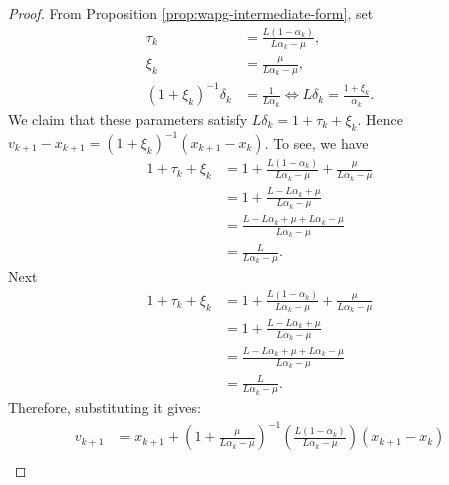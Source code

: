 \documentclass[12pt]{article}
\begin{document}
        \begin{proof}
            From Proposition \ref{prop:wapg-intermediate-form}, set 
            \begin{align*}
                \tau_k &= \frac{L(1 - \alpha_k)}{L\alpha_k - \mu}, 
                \\
                \xi_k &= \frac{\mu}{L \alpha_k - \mu},
                \\
                (1 + \xi_k)^{-1}\delta_k &= \frac{1}{L\alpha_k}
                \iff L \delta_k = \frac{1 + \xi_k}{\alpha_k}. 
            \end{align*}
            We claim that these parameters satisfy $L\delta_k = 1 + \tau_k + \xi_k$. 
            Hence $v_{k + 1} - x_{k + 1} = (1 + \xi_k)^{-1}(x_{k + 1} - x_k)$. 
            To see, we have 
            \begin{align*}
                1 + \tau_k + \xi_k &= 
                1 + \frac{L(1 - \alpha_k)}{L \alpha_k - \mu} 
                + \frac{\mu}{L \alpha_k - \mu}
                \\
                &= 
                1 + \frac{L - L \alpha_k + \mu}{L\alpha_k - \mu}
                \\
                &= 
                \frac{L - L \alpha_k + \mu + L \alpha_k - \mu}{L\alpha_k - \mu}
                \\
                &= \frac{L}{L\alpha_k - \mu}. 
            \end{align*}
            Next
            \begin{align*}
                1 + \tau_k + \xi_k &= 
                1 + \frac{L(1 - \alpha_k)}{L \alpha_k - \mu} 
                + \frac{\mu}{L \alpha_k - \mu}
                \\
                &= 
                1 + \frac{L - L \alpha_k + \mu}{L\alpha_k - \mu}
                \\
                &= 
                \frac{L - L \alpha_k + \mu + L \alpha_k - \mu}{L\alpha_k - \mu}
                \\
                &= \frac{L}{L\alpha_k - \mu}. 
            \end{align*}
            Therefore, substituting it gives: 
            \begin{align*}
                v_{k + 1} &= 
                x_{k + 1} + \left(
                    1 + \frac{\mu}{L\alpha_k - \mu}
                \right)^{-1}\left(
                    \frac{L(1 - \alpha_k)}{L\alpha_k - \mu}
                \right)(x_{k + 1} - x_k)
                \\

\end{align*}
\end{proof}
\end{document}
